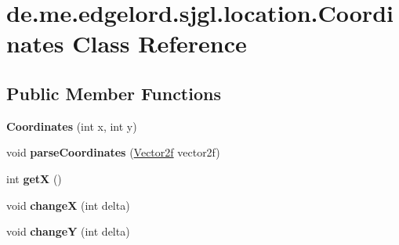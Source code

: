 \hypertarget{classde_1_1me_1_1edgelord_1_1sjgl_1_1location_1_1_coordinates}{}\section{de.\+me.\+edgelord.\+sjgl.\+location.\+Coordinates Class Reference}
\label{classde_1_1me_1_1edgelord_1_1sjgl_1_1location_1_1_coordinates}
\subsection*{Public Member Functions}
\begin{DoxyCompactItemize}
\item 
\mbox{\label{classde_1_1me_1_1edgelord_1_1sjgl_1_1location_1_1_coordinates_a9d742eadf80a1b4d369611b0119d0825}} 
{\bfseries Coordinates} (int x, int y)
\item 
\mbox{\label{classde_1_1me_1_1edgelord_1_1sjgl_1_1location_1_1_coordinates_a9cdb6f0263e2d1d5716627258a695ddc}} 
void {\bfseries parse\+Coordinates} (\mbox{\hyperlink{classde_1_1me_1_1edgelord_1_1sjgl_1_1location_1_1_vector2f}{Vector2f}} vector2f)
\item 
\mbox{\label{classde_1_1me_1_1edgelord_1_1sjgl_1_1location_1_1_coordinates_a81aeac4328243853bdd6be1f3d6fb53f}} 
int {\bfseries getX} ()
\item 
\mbox{\label{classde_1_1me_1_1edgelord_1_1sjgl_1_1location_1_1_coordinates_a2ccf5cf0dfb31d8bdfa52dfd96897a70}} 
void {\bfseries changeX} (int delta)
\item 
\mbox{\label{classde_1_1me_1_1edgelord_1_1sjgl_1_1location_1_1_coordinates_a0baf0c9e39e61f2e6833d8d3efb855d2}} 
void {\bfseries changeY} (int delta)
\item 
\mbox{\label{classde_1_1me_1_1edgelord_1_1sjgl_1_1location_1_1_coordinates_a4d4761ee455dd47745c7be63deabf45a}} 

\end{DoxyCompactItemize}
